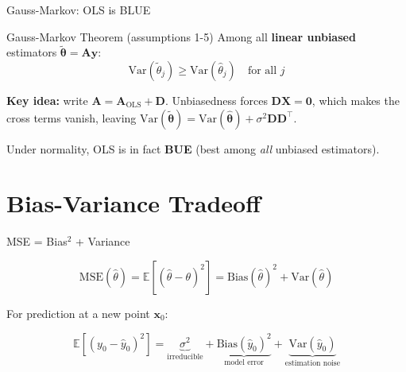 \documentclass[aspectratio=169, professionalfonts]{beamer}
\def\E{\mathbb{E}}
\def\Var{\text{Var}}
\def\Bias{\text{Bias}}
\def\MSE{\text{MSE}}
\begin{document}
\begin{frame}{Gauss-Markov: OLS is BLUE}

\begin{alertblock}{Gauss-Markov Theorem (assumptions 1-5)}
Among all \textbf{linear unbiased} estimators
$\tilde{\bm{\theta}} = \mathbf{A}\mathbf{y}$:
$$\Var(\tilde{\theta}_j) \ge \Var(\hat{\theta}_j)
  \quad\text{for all } j$$
\end{alertblock}

\bigskip

\textbf{Key idea:} write $\mathbf{A} = \mathbf{A}_{\text{OLS}} + \mathbf{D}$.
Unbiasedness forces $\mathbf{D}\mathbf{X} = \mathbf{0}$, which makes the
cross terms vanish, leaving $\Var(\tilde{\bm{\theta}})
= \Var(\hat{\bm{\theta}}) + \sigma^2\mathbf{D}\mathbf{D}^\top$.

\bigskip

Under normality, OLS is in fact \textbf{BUE} (best among
\emph{all} unbiased estimators).

\end{frame}

\section{Bias-Variance Tradeoff}

\begin{frame}{MSE = Bias$^2$ + Variance}

$$\MSE(\hat{\theta})
  = \E[(\hat{\theta} - \theta)^2]
  = \Bias(\hat{\theta})^2 + \Var(\hat{\theta})$$

\bigskip

For prediction at a new point $\mathbf{x}_0$:

$$\E[(y_0 - \hat{y}_0)^2]
  = \underbrace{\sigma^2}_{\text{irreducible}}
  + \underbrace{\Bias(\hat{y}_0)^2}_{\text{model error}}
  + \underbrace{\Var(\hat{y}_0)}_{\text{estimation noise}}$$

\end{frame}
\end{document}

